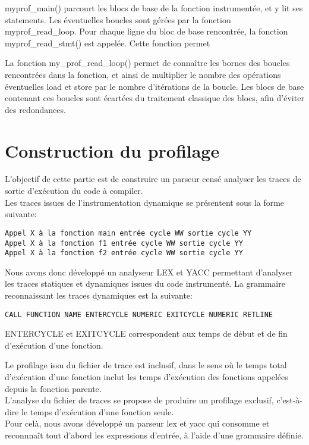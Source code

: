 \documentclass[oneside,11pt]{article}
\begin{document}
myprof\_main() parcourt les blocs de base de la fonction instrumentée, et y lit ses statements. Les éventuelles boucles sont gérées par la fonction myprof\_read\_loop.
Pour chaque ligne du bloc de base rencontrée, la fonction myprof\_read\_stmt() est appelée. Cette fonction permet 

La fonction my\_prof\_read\_loop() permet de connaître les bornes des boucles rencontrées dans la fonction, et ainsi de multiplier le nombre des opérations éventuelles load et store par le nombre d'itérations de la boucle. Les blocs de base contenant ces boucles sont écartées du traitement classique des blocs, afin d'éviter des redondances.

\section{Construction du profilage}

L'objectif de cette partie est de construire un parseur censé analyser les traces de sortie d'exécution du code à compiler.\\

Les traces issues de l'instrumentation dynamique se présentent sous la forme suivante:
\begin{verbatim}
Appel X à la fonction main entrée cycle WW sortie cycle YY
Appel X à la fonction f1 entrée cycle WW sortie cycle YY
Appel X à la fonction f2 entrée cycle WW sortie cycle YY
\end{verbatim}

Nous avons donc développé un analyseur LEX et YACC permettant d'analyser les traces statiques et dynamiques issues du code instrumenté.
La grammaire reconnaissant les traces dynamiques est la suivante:
\begin{verbatim}
CALL FUNCTION NAME ENTERCYCLE NUMERIC EXITCYCLE NUMERIC RETLINE
\end{verbatim}

ENTERCYCLE et EXITCYCLE correspondent aux temps de début et de fin d'exécution d'une fonction.

Le profilage issu du fichier de trace est inclusif, dans le sens où le temps total d'exécution d'une fonction inclut les temps d'exécution des fonctions appelées depuis la fonction parente.\\
L'analyse du fichier de traces se propose de produire un profilage exclusif, c'est-à-dire le temps d'exécution d'une fonction seule.\\
Pour celà, nous avons développé un parseur lex et yacc qui consomme et reconnnaît tout d'abord les expressions d'entrée, à l'aide d'une grammaire définie.\\
\end{document}
